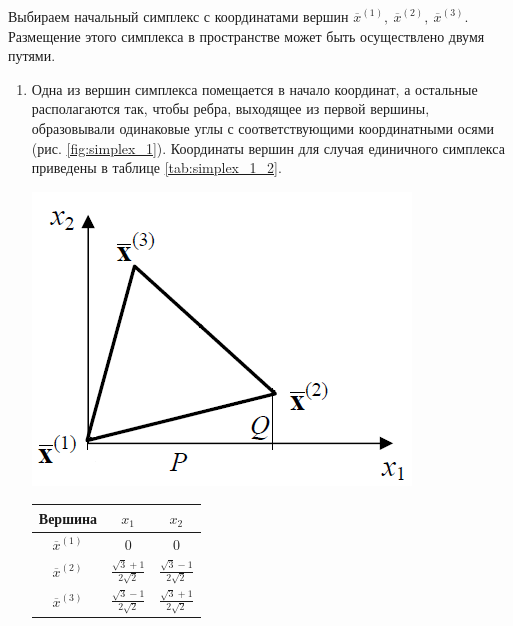 \documentclass[a4paper,12pt]{report}
\begin{document}
Выбираем начальный симплекс с координатами вершин $\overline{x}^{(1)},\ \overline{x}^{(2)},\ \overline{x}^{(3)}$. Размещение этого симплекса в пространстве может быть осуществлено двумя путями.
\begin{enumerate}
\item Одна из вершин симплекса помещается в начало координат, а остальные располагаются так, чтобы ребра, выходящее из первой вершины, образовывали одинаковые углы с соответствующими координатными осями (рис. \ref{fig:simplex_1}). Координаты вершин для случая единичного симплекса приведены в таблице \ref{tab:simplex_1_2}.

\begin{minipage}{\textwidth}
  \begin{minipage}{0.49\textwidth}
    \centering
    \includegraphics[width=0.7\linewidth]{simplex_1.png}
    \label{fig:simplex_1}
  \end{minipage}
  \hfill
  \begin{minipage}{0.49\textwidth}
    \centering
    \captionsetup{justification=raggedleft}
    \label{tab:simplex_1_2}
    \begin{tabular}{|c|c|c|}
      \hline
      Вершина & $x_{1}$ & $x_{2}$\\
      \hline
      $\overline{x}^{(1)}$ & 0 & 0\\
      \hline
      $\overline{x}^{(2)}$ & $\frac{\sqrt{3} + 1}{2\sqrt{2}}$ & $\frac{\sqrt{3} - 1}{2\sqrt{2}}$\\
      \hline
      $\overline{x}^{(3)}$ & $\frac{\sqrt{3} - 1}{2\sqrt{2}}$ & $\frac{\sqrt{3} + 1}{2\sqrt{2}}$\\
      \hline
    \end{tabular}
  \end{minipage}
\end{minipage}


\end{enumerate}
\end{document}
